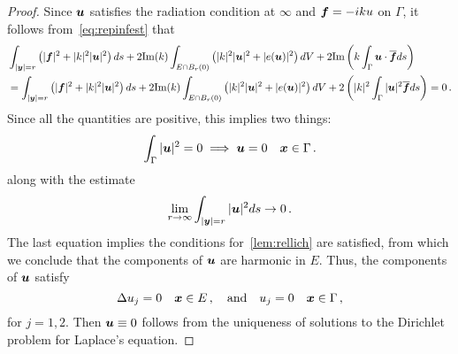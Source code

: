 \begin{proof}
Since ${\boldsymbol u}$ satisfies the radiation condition at $\infty$ and ${\boldsymbol f} = -ik u$
on $\Gamma$, it follows from~\cref{eq:repinfest} that
\begin{align}
&
\int_{|{\boldsymbol y}|=r} \left( |{\boldsymbol f}|^2 + |k|^2 |{\boldsymbol u}|^2 \right) ds +
2 \text{Im}(k) \int_{E \cap B_{r}(0)} \left(|k|^2 |{\boldsymbol u}|^2 + |e({\boldsymbol u})|^2 \right)
dV +2 \text{Im} \left( k \int_{\Gamma} {\boldsymbol u} \cdot \overline{{\boldsymbol f}} ds  \right) \\
&= 
\int_{|{\boldsymbol y}|=r} \left( |{\boldsymbol f}|^2 + |k|^2 |{\boldsymbol u}|^2 \right) ds +
2 \text{Im}(k) \int_{E \cap B_{r}(0)} \left(|k|^2 |{\boldsymbol u}|^2 + |e({\boldsymbol u})|^2 \right)
dV +2 \left( |k|^{2} \int_{\Gamma} |{\boldsymbol u}|^{2} \overline{{\boldsymbol f}} ds  \right) = 0 
\, .
\end{align}
Since all the quantities are positive, this implies two things:
\begin{equation}
\int_{\Gamma} |{\boldsymbol u}|^{2} = 0 \implies {\boldsymbol u} = 0  \quad {\boldsymbol x} \in \Gamma \, .
\end{equation}
along with the estimate
\begin{equation}
\lim_{r\to\infty} \int_{|{\boldsymbol y}|=r} |{\boldsymbol u}|^{2} ds \to 0 \, .
\end{equation}
The last equation implies the conditions for~\cref{lem:rellich}
are satisfied, from which we conclude that the components of ${\boldsymbol u}$ 
are harmonic in $E$. 
Thus, the components of ${\boldsymbol u}$ satisfy
\begin{equation}
\Delta u_{j}=  0 \quad {\boldsymbol x} \in E \,, \quad \text{and} \quad
u_{j} = 0 \quad {\boldsymbol x} \in \Gamma \, ,
\end{equation}
for $j=1,2$.
Then ${\boldsymbol u} \equiv 0$ follows from the uniqueness of solutions to the 
Dirichlet problem for Laplace's equation.
\end{proof}
